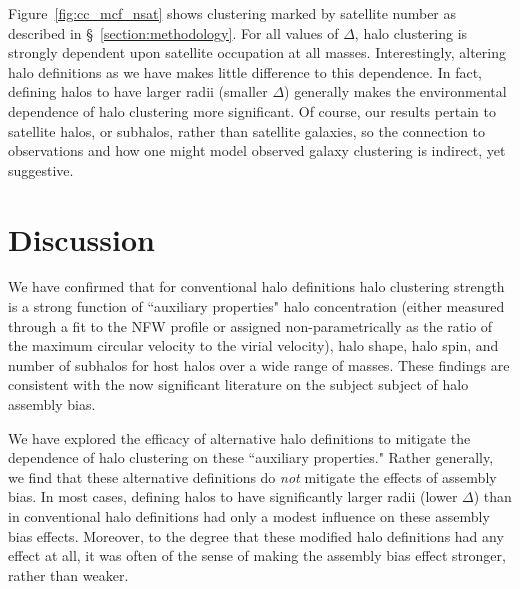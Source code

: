 \documentclass[usenatbib]{mnras}
\begin{document}
Figure~\ref{fig:cc_mcf_nsat} shows clustering marked by satellite number as described in 
\S~\ref{section:methodology}. For all values of $\Delta$, halo clustering is strongly dependent 
upon satellite occupation at all masses. Interestingly, altering halo definitions as we have 
makes little difference to this dependence. In fact, defining halos to have larger radii (smaller 
$\Delta$) generally makes the environmental dependence of halo clustering more 
significant. Of course, our results pertain to satellite halos, or subhalos, rather than 
satellite galaxies, so the connection to observations and how one might 
model observed galaxy clustering is indirect, yet suggestive. 


\section{Discussion}
\label{section:discussion}


We have confirmed that for conventional halo definitions 
halo clustering strength is a strong function of ``auxiliary properties" halo concentration (either measured
through a fit to the NFW profile or assigned non-parametrically as the ratio of the maximum circular velocity to
the virial velocity), halo shape, halo spin, and number of subhalos 
for host halos over a wide range of masses. These findings are consistent 
with the now significant literature on the subject subject of halo assembly bias. \citep{peacock_smith00, wechsler_etal02,
sheth_tormen04, gao_etal05, zentner_etal05, allgood_etal06, harker_etal06, wechsler_etal06, croton_etal07, dalal_etal08, mao_etal15, sunayama_etal16}

We have explored the efficacy of alternative halo definitions to mitigate the dependence of halo 
clustering on these ``auxiliary properties." Rather generally, we find that these alternative definitions 
do {\em not} mitigate the effects of assembly bias. In most cases, defining halos to have significantly 
larger radii (lower $\Delta$) than in conventional halo definitions had only a modest influence on 
these assembly bias effects. Moreover, to the degree that these modified halo definitions had 
any effect at all, it was often of the sense of 
making the assembly bias effect stronger, rather than weaker. 
\end{document}
